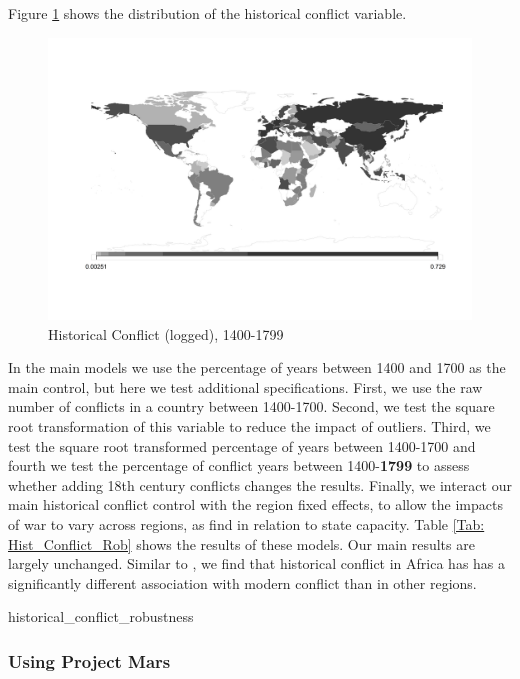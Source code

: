 Figure \ref{Fig: BreckeMap} shows the distribution of the historical conflict variable. 

\begin{figure}[hpbt] 
   	\includegraphics[width=\textwidth]{img/historical_conflict_map.png} 
	\caption{Historical Conflict (logged), 1400-1799} 
	\label{Fig: BreckeMap} 
\end{figure}

In the main models we use the percentage of years between 1400 and 1700 as the
main control, but here we test additional specifications. First, we use the raw
number of conflicts in a country between 1400-1700. Second, we test the square
root transformation of this variable to reduce the impact of outliers. Third, we
test the square root transformed percentage of years between 1400-1700 and
fourth we test the percentage of conflict years between 1400-\textbf{1799} to
assess whether adding 18th century conflicts changes the results. Finally, we
interact our main historical conflict control with the region fixed effects, to
allow the impacts of war to vary across regions, as \citet{Dincecco2019} find in
relation to state capacity. Table \ref{Tab: Hist_Conflict_Rob} shows the results
of these models. Our main results are largely unchanged. Similar to
\citet{Dincecco2019}, we find that historical conflict in Africa has has a
significantly different association with modern conflict than in other regions. 

{historical_conflict_robustness}

\clearpage

\subsubsection{Using Project Mars}

